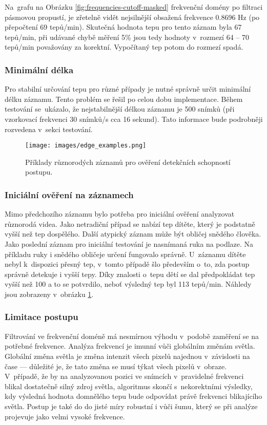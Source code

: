 \documentclass[
  digital, %
  table,   %
%
  lof,     %
  lot,     %
]{fithesis3}
\begin{document}
Na~grafu na Obrázku \ref{fig:frequencies-cutoff-masked} frekvenční domény po filtraci pásmovou propustí, je zřetelně vidět nejsilnější obsažená frekvence 0.8696 Hz (po přepočtení 69 tepů/min). Skutečná hodnota tepu pro tento záznam byla 67 tepů/min, při udávané chybě měření 5\% jsou tedy hodnoty v~rozmezí 64 -- 70 tepů/min považovány za korektní. Vypočítaný tep potom do rozmezí spadá.

\subsubsection{Minimální délka}
Pro stabilní určování tepu pro různé případy je nutné správně určit minimální délku záznamu. Tento problém se řešil po celou dobu implementace. Během testování se~ukázalo, že nejstabilnější délkou záznamu je 500 snímků (při vzorkovací frekvenci 30 snímků/s cca 16 sekund). Tato informace bude podrobněji rozvedena v~sekci testování.

\begin{figure}[t]
  \begin{center}
    \texttt{[image: images/edge\_examples.png]}
  \end{center}
  \caption{Příklady různorodých záznamů pro ověření detekčních schopností postupu.}
  \label{fig:edge_examples}
\end{figure}

\subsubsection{Iniciální ověření na záznamech}
Mimo předchozího záznamu bylo potřeba pro iniciální ověření analyzovat různorodá videa. Jako netradiční případ se nabízí tep dítěte, který je podstatně vyšší než tep dospělého. Další atypický záznam může být obličej snědého člověka. Jako poslední záznam pro iniciální testování je nasnímaná ruka na podlaze. Na příkladu ruky i snědého obličeje určení fungovalo správně. U~záznamu dítěte nebyl k~dispozici přesný tep, v~tomto případě šlo především o~to, zda postup správně detekuje i vyšší tepy. Díky znalosti o~tepu dětí se dal předpokládat tep vyšší než 100 a to se potvrdilo, neboť výsledný tep byl 113 tepů/min. Náhledy jsou zobrazeny v~obrázku \ref{fig:edge_examples}. 

\subsubsection{Limitace postupu}
Filtrování ve frekvenční doméně má nesmírnou výhodu v~podobě zaměření se na potřebné frekvence. Analýza frekvencí je imunní vůči globálním změnám světla. Globální změna světla je změna intenzit všech pixelů najednou v~závislosti na čase --- důležité je, že tato změna se musí týkat všech pixelů v~obraze. V~případě, že by na analyzovanou pozici ve snímcích v~pravidelné frekvenci blikal dostatečně silný zdroj světla, algoritmus skončí s~nekorektními výsledky, kdy výsledná hodnota domnělého tepu bude odpovídat právě frekvenci blikajícího světla. Postup je také do do jisté míry robustní i vůči šumu, který se při analýze projevuje jako velmi vysoké frekvence.
\end{document}
